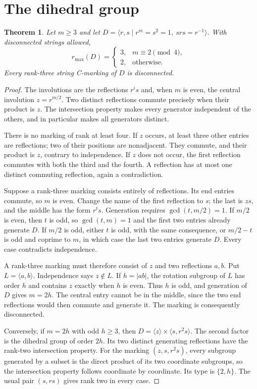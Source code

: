 \documentclass[11pt,a4paper]{article}
\newtheorem{theorem}{Theorem}
\newcommand{\gen}[1]{\langle#1\rangle}
\begin{document}
\section{The dihedral group}
\begin{theorem}
Let $m\ge3$ and let $D=\gen{r,s\mid r^m=s^2=1,\ srs=r^{-1}}$.
With disconnected strings allowed,
\[
 r_{\max}(D)=
 \begin{cases}3,&m\equiv2\pmod4,\\2,&\text{otherwise.}\end{cases}
\]
Every rank-three string C-marking of $D$ is disconnected.
\end{theorem}
\begin{proof}
The involutions are the reflections $r^i s$ and, when $m$ is even, the
central involution $z=r^{m/2}$. Two distinct reflections commute precisely
when their product is $z$. The intersection property makes every generator
independent of the others, and in particular makes all generators distinct.

There is no marking of rank at least four. If $z$ occurs, at least three
other entries are reflections; two of their positions are nonadjacent.
They commute, and their product is $z$, contrary to independence. If $z$
does not occur, the first reflection commutes with both the third and the
fourth. A reflection has at most one distinct commuting reflection, again
a contradiction.

Suppose a rank-three marking consists entirely of reflections. Its end
entries commute, so $m$ is even. Change the name of the first reflection to
$s$; the last is $zs$, and the middle has the form $r^t s$.
Generation requires $\gcd(t,m/2)=1$. If $m/2$ is even, then $t$ is odd,
so $\gcd(t,m)=1$ and the first two entries already generate $D$.
If $m/2$ is odd, either $t$ is odd, with the same consequence, or
$m/2-t$ is odd and coprime to $m$, in which case the last two entries
generate $D$. Every case contradicts independence.

A rank-three marking must therefore consist of $z$ and two reflections
$a,b$. Put $L=\gen{a,b}$. Independence says $z\notin L$. If
$h=|ab|$, the rotation subgroup of $L$ has order $h$ and contains $z$
exactly when $h$ is even. Thus $h$ is odd, and generation of $D$ gives
$m=2h$. The central entry cannot be in the middle, since the two end
reflections would then commute and generate it. The marking is consequently
disconnected.

Conversely, if $m=2h$ with odd $h\ge3$, then
$D=\gen{z}\times\gen{s,r^2s}$. The second factor is the dihedral group of
order $2h$. Its two distinct generating reflections have the rank-two
intersection property. For the marking $(z,s,r^2s)$, every subgroup generated
by a subset is the direct product of its two coordinate subgroups, so the
intersection property follows coordinate by coordinate. Its type is
$\{2,h\}$. The usual pair $(s,rs)$ gives rank two in every case.
\end{proof}
\end{document}
